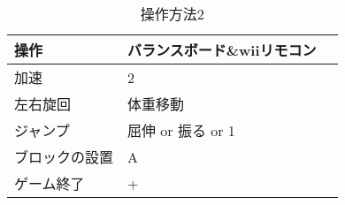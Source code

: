 \documentclass{jarticle}
\begin{document}
\begin{table}[H]
    \caption{操作方法2}
    \label{table:control2}
    \begin{center}
    \begin{tabular}{|l|l|l|}\hline
    操作 & バランスボード\&wiiリモコン\\ \hline
    加速 & 2 \\ \hline
    左右旋回 & 体重移動 \\ \hline
    ジャンプ & 屈伸 or 振る or 1 \\ \hline
    ブロックの設置 & A \\ \hline
    ゲーム終了 & + \\\hline
    \end{tabular}
    \end{center}
\end{table}
\end{document}

